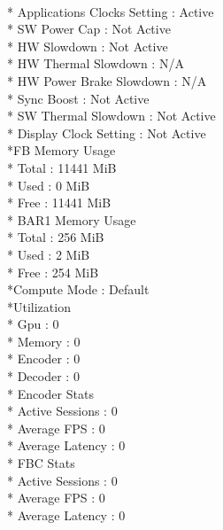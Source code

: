\documentclass{article}
\begin{document}
      \\*   Applications Clocks Setting       : Active
      \\*   SW Power Cap                      : Not Active
       \\*  HW Slowdown                       : Not Active
          \\*   HW Thermal Slowdown           : N/A
         \\*    HW Power Brake Slowdown       : N/A
        \\* Sync Boost                        : Not Active
        \\* SW Thermal Slowdown               : Not Active
        \\* Display Clock Setting             : Not Active
     \\*FB Memory Usage
      \\*   Total                             : 11441 MiB
     \\*    Used                              : 0 MiB
     \\*    Free                              : 11441 MiB
    \\* BAR1 Memory Usage
    \\*     Total                             : 256 MiB
    \\*     Used                              : 2 MiB
     \\*    Free                              : 254 MiB
     \\*Compute Mode                          : Default
     \\*Utilization
     \\*    Gpu                               : 0 %
       \\*  Memory                            : 0 %
      \\*   Encoder                           : 0 %
     \\*    Decoder                           : 0 %
    \\* Encoder Stats
     \\*    Active Sessions                   : 0
    \\*     Average FPS                       : 0
     \\*    Average Latency                   : 0
   \\*  FBC Stats
    \\*     Active Sessions                   : 0
    \\*     Average FPS                       : 0
    \\*     Average Latency                   : 0
\end{document}
